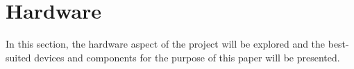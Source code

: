\chapter{Hardware}\label{sec:hardware}
In this section, the hardware aspect of the project will be explored and the best-suited devices and components for the purpose of this paper will be presented.




